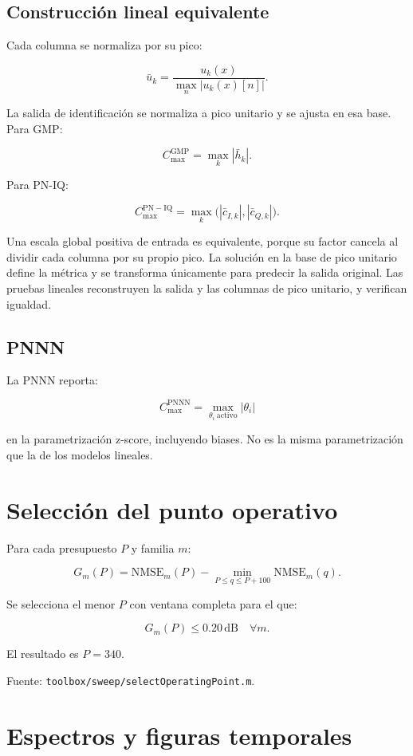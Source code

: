 \documentclass[10pt,a4paper]{article}
\newcommand{\code}[1]{\texttt{#1}}
\begin{document}
\subsection{Construcción lineal equivalente}

Cada columna se normaliza por su pico:

\[
\bar u_k=\frac{u_k(x)}{\max_n|u_k(x)[n]|}.
\]

La salida de identificación se normaliza a pico unitario y se ajusta en esa
base. Para GMP:

\[
C_{\max}^{\mathrm{GMP}}
=\max_k|\bar h_k|.
\]

Para PN-IQ:

\[
C_{\max}^{\mathrm{PN-IQ}}
=\max_k\big(
|\bar c_{I,k}|,
|\bar c_{Q,k}|
\big).
\]

Una escala global positiva de entrada es equivalente, porque su factor cancela
al dividir cada columna por su propio pico. La solución en la base de pico
unitario define la métrica y se transforma únicamente para predecir la salida
original. Las pruebas lineales reconstruyen la salida y las columnas de pico
unitario, y verifican igualdad.

\subsection{PNNN}

La PNNN reporta:

\[
C_{\max}^{\mathrm{PNNN}}
=\max_{\theta_i\ \mathrm{activo}}|\theta_i|
\]

en la parametrización z-score, incluyendo biases. No es la misma
parametrización que la de los modelos lineales.

\section{Selección del punto operativo}

Para cada presupuesto \(P\) y familia \(m\):

\[
G_m(P)=
\mathrm{NMSE}_m(P)
-
\min_{P\le q\le P+100}
\mathrm{NMSE}_m(q).
\]

Se selecciona el menor \(P\) con ventana completa para el que:

\[
G_m(P)\le0.20\,\mathrm{dB}
\quad\forall m.
\]

El resultado es \(P=340\).

Fuente: \code{toolbox/sweep/selectOperatingPoint.m}.

\section{Espectros y figuras temporales}
\end{document}
